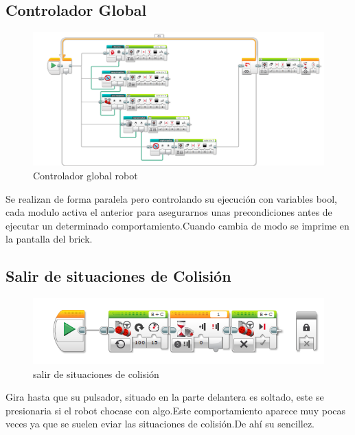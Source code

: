 \documentclass[12pt,a4paper]{article}
\begin{document}
\subsection{Controlador Global}
\begin{figure}[H]
	\caption{Controlador global robot}
	\includegraphics[scale=0.45]{RobotControladorGlobal.PNG}
\end{figure}
Se realizan de forma paralela pero controlando su ejecución con variables bool, cada modulo activa el anterior para asegurarnos unas precondiciones antes de ejecutar un determinado comportamiento.Cuando cambia de modo se imprime en la pantalla del brick.
\subsection{Salir de situaciones de Colisión}
\begin{figure}[H]
	\caption{salir de situaciones de colisión}
	\includegraphics{RobotDesatascar.PNG}
	\centering
\end{figure}
Gira hasta que su pulsador, situado en la parte delantera es soltado, este se presionaria si el robot chocase con algo.Este comportamiento aparece muy pocas veces ya que se suelen eviar las situaciones de colisión.De ahí su sencillez.
\end{document}
